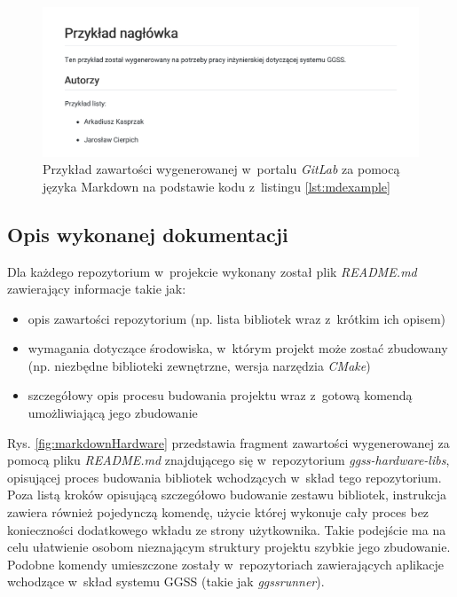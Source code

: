 \begin{figure}
\centering
\caption{Przykład zawartości wygenerowanej w~portalu \textit{GitLab} za pomocą języka Markdown na podstawie kodu z~listingu \ref{lst:mdexample}}
\label{fig:markdownExample}
\includegraphics[width=\textwidth]{res/MarkdownExample}
\end{figure}

\newpage

\subsection{Opis wykonanej dokumentacji}
Dla każdego repozytorium w~projekcie wykonany został plik \textit{README.md} zawierający informacje takie jak:
\begin{itemize}
\item opis zawartości repozytorium (np. lista bibliotek wraz z~krótkim ich opisem)
\item wymagania dotyczące środowiska, w~którym projekt może zostać zbudowany (np. niezbędne biblioteki zewnętrzne, wersja narzędzia \textit{CMake})
\item szczegółowy opis procesu budowania projektu wraz z~gotową komendą umożliwiającą jego zbudowanie 
\end{itemize}

Rys. \ref{fig:markdownHardware} przedstawia fragment zawartości wygenerowanej za pomocą pliku \textit{README.md} znajdującego się w~repozytorium \textit{ggss-hardware-libs}, opisującej proces budowania bibliotek wchodzących w~skład tego repozytorium. Poza listą kroków opisującą szczegółowo budowanie zestawu bibliotek, instrukcja zawiera również pojedynczą komendę, użycie której wykonuje cały proces bez konieczności dodatkowego wkładu ze strony użytkownika. Takie podejście ma na celu ułatwienie osobom nieznającym struktury projektu szybkie jego zbudowanie. Podobne komendy umieszczone zostały w~repozytoriach zawierających aplikacje wchodzące w~skład systemu GGSS (takie jak \textit{ggssrunner}).

